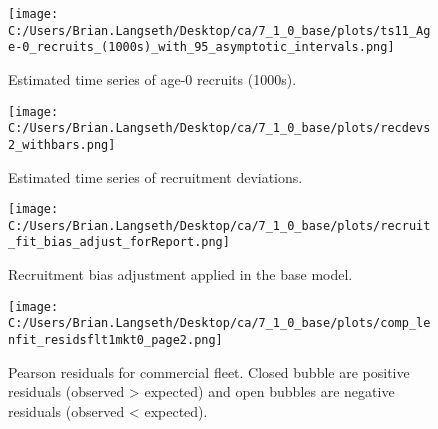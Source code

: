 \documentclass[11pt,
  english,
  letterpaper,
]{article}
\begin{document}
\tagmcend\tagstructend


\begin{figure}
\centering
\texttt{[image: C:/Users/Brian.Langseth/Desktop/ca/7\_1\_0\_base/plots/ts11\_Age-0\_recruits\_(1000s)\_with\_95\_asymptotic\_intervals.png]}
\caption{Estimated time series of age-0 recruits (1000s).\label{fig:recruits}}
\end{figure}

\tagmcend\tagstructend


\begin{figure}
\centering
\texttt{[image: C:/Users/Brian.Langseth/Desktop/ca/7\_1\_0\_base/plots/recdevs2\_withbars.png]}
\caption{Estimated time series of recruitment deviations.\label{fig:rec-devs}}
\end{figure}

\tagmcend\tagstructend


\begin{figure}
\centering
\texttt{[image: C:/Users/Brian.Langseth/Desktop/ca/7\_1\_0\_base/plots/recruit\_fit\_bias\_adjust\_forReport.png]}
\caption{Recruitment bias adjustment applied in the base model.\label{fig:bias-adj}}
\end{figure}

\tagmcend\tagstructend


\begin{figure}
\centering
\texttt{[image: C:/Users/Brian.Langseth/Desktop/ca/7\_1\_0\_base/plots/comp\_lenfit\_residsflt1mkt0\_page2.png]}
\caption{Pearson residuals for commercial fleet. Closed bubble are positive residuals (observed \textgreater{} expected) and open bubbles are negative residuals (observed \textless{} expected).\label{fig:com-pearson}}
\end{figure}
\end{document}
